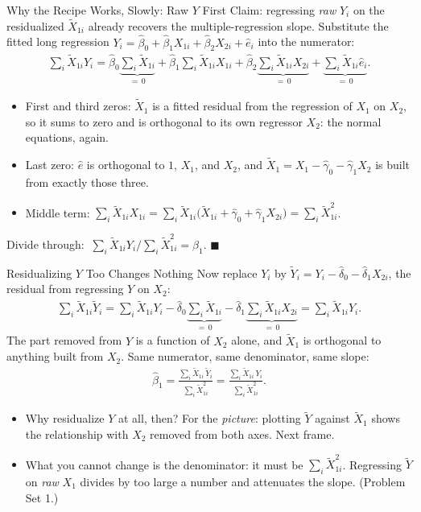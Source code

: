 \documentclass[aspectratio=169,11pt,xcolor=dvipsnames]{beamer}
\begin{document}
\begin{frame}{Why the Recipe Works, Slowly: Raw $Y$ First}
Claim: regressing \emph{raw} $Y_i$ on the residualized $\tilde X_{1i}$ already
recovers the multiple-regression slope. Substitute the fitted long regression
$Y_i = \hat\beta_0 + \hat\beta_1 X_{1i} + \hat\beta_2 X_{2i} + \hat e_i$ into
the numerator:
\begin{align*}
  \sum_i \tilde X_{1i} Y_i
  = \hat\beta_0\underbrace{\sum_i \tilde X_{1i}}_{=\,0}
  + \hat\beta_1\sum_i \tilde X_{1i}X_{1i}
  + \hat\beta_2\underbrace{\sum_i \tilde X_{1i}X_{2i}}_{=\,0}
  + \underbrace{\sum_i \tilde X_{1i}\hat e_i}_{=\,0} .
\end{align*}
\begin{itemize}\itemsep2pt
  \item First and third zeros: $\tilde X_1$ is a fitted residual from the
        regression of $X_1$ on $X_2$, so it sums to zero and is orthogonal to
        its own regressor $X_2$: the normal equations, again.
  \item Last zero: $\hat e$ is orthogonal to $1$, $X_1$, and $X_2$, and
        $\tilde X_1 = X_1 - \hat\gamma_0 - \hat\gamma_1X_2$ is built from
        exactly those three.
  \item Middle term: $\sum_i \tilde X_{1i}X_{1i} = \sum_i \tilde X_{1i}
        \big(\tilde X_{1i} + \hat\gamma_0 + \hat\gamma_1 X_{2i}\big)
        = \sum_i \tilde X_{1i}^2$.
\end{itemize}
\vskip2pt
Divide through:
$\ \sum_i \tilde X_{1i}Y_i \big/ \sum_i \tilde X_{1i}^2 = \hat\beta_1$.
$\blacksquare$
\end{frame}

\begin{frame}{Residualizing $Y$ Too Changes Nothing}
Now replace $Y_i$ by $\tilde Y_i = Y_i - \hat\delta_0 - \hat\delta_1 X_{2i}$,
the residual from regressing $Y$ on $X_2$:
\begin{align*}
  \sum_i \tilde X_{1i}\tilde Y_i
  = \sum_i \tilde X_{1i} Y_i
  - \hat\delta_0\underbrace{\sum_i \tilde X_{1i}}_{=\,0}
  - \hat\delta_1\underbrace{\sum_i \tilde X_{1i}X_{2i}}_{=\,0}
  = \sum_i \tilde X_{1i} Y_i .
\end{align*}
The part removed from $Y$ is a function of $X_2$ alone, and $\tilde X_1$ is
orthogonal to anything built from $X_2$. Same numerator, same denominator, same
slope:
\begin{align*}
  \hat\beta_1
  = \frac{\sum_i \tilde X_{1i}\,\tilde Y_i}{\sum_i \tilde X_{1i}^2}
  = \frac{\sum_i \tilde X_{1i}\,Y_i}{\sum_i \tilde X_{1i}^2} .
\end{align*}
\begin{itemize}\itemsep2pt
  \item Why residualize $Y$ at all, then? For the \emph{picture}: plotting
        $\tilde Y$ against $\tilde X_1$ shows the relationship with $X_2$
        removed from both axes. Next frame.
  \item \alert{What you cannot change is the denominator}: it must be
        $\sum_i \tilde X_{1i}^2$. Regressing $\tilde Y$ on \emph{raw} $X_1$
        divides by too large a number and attenuates the slope. (Problem Set 1.)
\end{itemize}
\end{frame}
\end{document}
